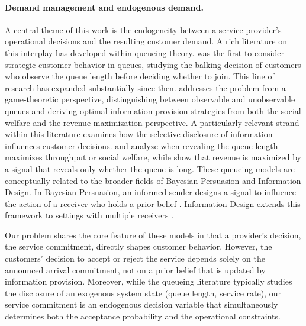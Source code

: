 \documentclass[11pt]{article}
\theoremstyle{plain}
\theoremstyle{definition}
\begin{document}
	\paragraph{Demand management and endogenous demand.}
	A central theme of this work is the endogeneity between a service provider's operational decisions and the resulting customer demand. A rich literature on this interplay has developed within queueing theory. \cite{naor1969regulation} was the first to consider strategic customer behavior in queues, studying the balking decision of customers who observe the queue length before deciding whether to join. This line of research has expanded substantially since then. \cite{economou2021impact} addresses the problem from a game-theoretic perspective, distinguishing between observable and unobservable queues and deriving optimal information provision strategies from both the social welfare and the revenue maximization perspective.
	A particularly relevant strand within this literature examines how the selective disclosure of information influences customer decisions. \cite{simhon2016optimal} and \cite{li2021optimal} analyze when revealing the queue length maximizes throughput or social welfare, while \cite{lingenbrink2019optimal} show that revenue is maximized by a signal that reveals only whether the queue is long.
	These queueing models are conceptually related to the broader fields of Bayesian Persuasion and Information Design. In Bayesian Persuasion, an informed sender designs a signal to influence the action of a receiver who holds a prior belief \citep{kamenica2011bayesian, kamenica2019bayesian}. Information Design extends this framework to settings with multiple receivers \citep{bergemann2019information}.
	
	Our problem shares the core feature of these models in that a provider's decision, the service commitment, directly shapes customer behavior.
	However, the customers' decision to accept or reject the service depends solely on the announced arrival commitment, not on a prior belief that is updated by information provision. 
	Moreover, while the queueing literature typically studies the disclosure of an exogenous system state (queue length, service rate), our service commitment is an endogenous decision variable that simultaneously determines both the acceptance probability and the operational constraints.
\end{document}
